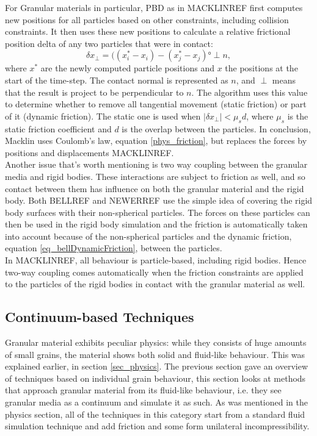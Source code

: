 For Granular materials in particular, PBD as in MACKLINREF first computes new positions for all particles based on other constraints, including collision constraints. It then uses these new positions to calculate a relative frictional position delta of any two particles that were in contact:
\begin{equation}
\delta x_{\perp} = ( (x_i^* - x_i) - (x_j^* - x_j) ° \perp n,
\end{equation}
where $x^*$ are the newly computed particle positions and $x$ the positions at the start of the time-step. The contact normal is represented as $n$, and $\perp$ means that the result is project to be perpendicular to $n$. The algorithm uses this value to determine whether to remove all tangential movement (static friction) or part of it (dynamic friction). The static one is used when $|\delta x_{\perp}| < \mu_s d$, where $\mu_s$ is the static friction coefficient and $d$ is the overlap between the particles. In conclusion, Macklin uses Coulomb's law, equation \eqref{phys_friction}, but replaces the forces by positions and displacements MACKLINREF.\\

Another issue that's worth mentioning is two way coupling between the granular media and rigid bodies. These interactions are subject to friction as well, and so contact between them has influence on both the granular material and the rigid body. Both BELLREF and NEWERREF use the simple idea of covering the rigid body surfaces with their non-spherical particles. The forces on these particles can then be used in the rigid body simulation and the friction is automatically taken into account because of the non-spherical particles and the dynamic friction, equation \eqref{eq_bellDynamicFriction}, between the particles.\\

In MACKLINREF, all behaviour is particle-based, including rigid bodies. Hence two-way coupling comes automatically when the friction constraints are applied to the particles of the rigid bodies in contact with the granular material as well.


\subsection{Continuum-based Techniques}
Granular material exhibits peculiar physics: while they consists of huge amounts of small grains, the material shows both solid and fluid-like behaviour. This was explained earlier, in section \ref{sec_physics}. The previous section gave an overview of techniques based on individual grain behaviour, this section looks at methods that approach granular material from its fluid-like behaviour, i.e. they see granular media as a continuum and simulate it as such. As was mentioned in the physics section, all of the techniques in this category start from a standard fluid simulation technique and add friction and some form unilateral incompressibility.\\

